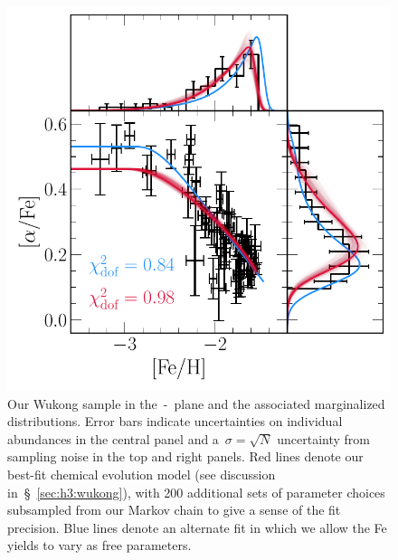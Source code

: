 \documentclass[ms.tex]{subfiles}
\begin{document}
\begin{figure}
\centering
\includegraphics[scale = 0.65]{wukong_bestfit.pdf}
\caption{
Our Wukong sample in the~\afe-\feh~plane and the associated marginalized
distributions.
Error bars indicate uncertainties on individual abundances in the central panel
and a~$\sigma = \sqrt{N}$ uncertainty from sampling noise in the top and right
panels.
Red lines denote our best-fit chemical evolution model (see discussion
in~\S~\ref{sec:h3:wukong}), with 200 additional sets of parameter choices
subsampled from our Markov chain to give a sense of the fit precision.
Blue lines denote an alternate fit in which we allow the Fe yields to vary as
free parameters.
}
\label{fig:wukong}
\end{figure}
\end{document}
